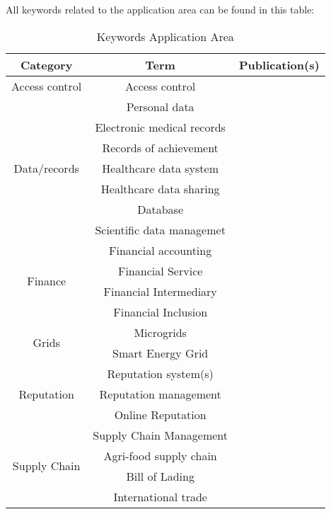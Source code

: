 \clearpage
All keywords related to the application area can be found in this table:
\begin{longtable}{ |c|c|p{4cm}| }
	\caption{Keywords Application Area} \\
	\hline
 	\textbf{Category} & \textbf{Term} & \textbf{Publication(s)} \\ [0.5ex] 
 	\hline\hline
 	\endhead
 	Access control & Access control & \cite{2016_Azaria,2017_Ouaddah}\\ 
	 \hline
	 \multirow{7}{*}{Data/records} & Personal data & \cite{2015_Zyskind} \\  \cline{2-3}
	 & Electronic medical records & \cite{2016_Azaria} \\ \cline{2-3}
	 & Records of achievement & \cite{2016_Sharples} \\ \cline{2-3}
	 & Healthcare data system & \multirow{2}{*}{\cite{2016_Yue}} \\ \cline{2-2}
	 & Healthcare data sharing & \\ \cline{2-3}
	 & Database & \cite{2017_Coyne} \\ \cline{2-3}
	 & Scientific data managemet & \cite{2017_Gipp} \\
	 \hline
	 \multirow{4}{*}{Finance} & Financial accounting & \cite{2017_Coyne} \\ \cline{2-3}
	 & Financial Service & \multirow{3}{*}{\cite{2017_Jaag}} \\ \cline{2-2}
	 & Financial Intermediary &  \\ \cline{2-2}
	 & Financial Inclusion &  \\
	 \hline
	 \multirow{2}{*}{Grids} & Microgrids & \cite{2016_Kianmajd} \\ \cline{2-3}
	 & Smart Energy Grid & \cite{2018_Alessandra} \\
	 \hline
	 \multirow{3}{*}{Reputation} & Reputation system(s) & \cite{2015_Dennis,2016_Schaub} \\ \cline{2-3}
	 & Reputation management & \cite{2016_Sharples} \\ \cline{2-3}
	 & Online Reputation & \cite{2016_Yasin} \\
	 \hline
	 \multirow{4}{*}{Supply Chain} & Supply Chain Management & \cite{2017_Madhwal}\\ \cline{2-3}
	 & Agri-food supply chain & \cite{2016_Tian} \\ \cline{2-3}
	 & Bill of Lading & \multirow{2}{*}{\cite{2017_Naerland}} \\ \cline{2-2}
	 & International trade & \\

\end{longtable}
